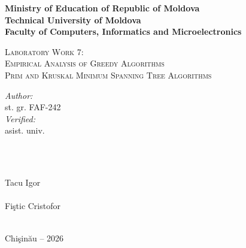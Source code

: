 \documentclass[12pt]{article}
\begin{document}
\begin{titlepage}
  \begin{center}
    \textbf{\large Ministry of Education of Republic of Moldova}\\[0.1cm]
    \textbf{\large Technical University of Moldova}\\[0.1cm]
    \textbf{\large Faculty of Computers, Informatics and Microelectronics}\\[1.2cm]

    \vspace{40mm}

    \textsc{\Large Laboratory Work 7:}\\[0.2cm]
    \textsc{\Large Empirical Analysis of Greedy Algorithms}\\[0.2cm]
    \textsc{\large Prim and Kruskal Minimum Spanning Tree Algorithms}\\[0.4cm]

    \vspace{65mm}

    \begin{minipage}[t]{0.4\textwidth}
      \begin{flushleft}\large
        \emph{Author:}\\
        st. gr. FAF-242\\[0.4cm]
        \emph{Verified:}\\
        asist. univ.
      \end{flushleft}
    \end{minipage}
    ~
    \begin{minipage}[t]{0.4\textwidth}
      \begin{flushright}\large
        \emph{}\\
        Tacu Igor\\[0.4cm]
        \emph{}\\
        Fi\c{s}tic Cristofor
      \end{flushright}
    \end{minipage}\\[2cm]

    \vspace{5mm}
    \large Chi\c{s}in\u{a}u -- 2026

    \vfill
  \end{center}
\end{titlepage}

\clearpage
\thispagestyle{empty}
\tableofcontents
\end{document}
